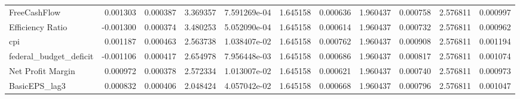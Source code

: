 \documentclass[12pt,a4paper,english]{article}
\begin{document}
{{\begin{tabular}{@{}lrrrrrrrrrr@{}}
			FreeCashFlow                  & 0.001303                 & 0.000387                    & 3.369357                  & 7.591269e-04                             & 1.645158                      & 0.000636                      & 1.960437                     & 0.000758                     & 2.576811                     & 0.000997                     \\
			Efficiency Ratio              & -0.001300                & 0.000374                    & 3.480253                  & 5.052090e-04                             & 1.645158                      & 0.000614                      & 1.960437                     & 0.000732                     & 2.576811                     & 0.000962                     \\
			cpi                           & 0.001187                 & 0.000463                    & 2.563738                  & 1.038407e-02                             & 1.645158                      & 0.000762                      & 1.960437                     & 0.000908                     & 2.576811                     & 0.001194                     \\
			federal\_budget\_deficit      & -0.001106                & 0.000417                    & 2.654978                  & 7.956448e-03                             & 1.645158                      & 0.000686                      & 1.960437                     & 0.000817                     & 2.576811                     & 0.001074                     \\
			Net Profit Margin             & 0.000972                 & 0.000378                    & 2.572334                  & 1.013007e-02                             & 1.645158                      & 0.000621                      & 1.960437                     & 0.000740                     & 2.576811                     & 0.000973                     \\
			BasicEPS\_lag3                & 0.000832                 & 0.000406                    & 2.048424                  & 4.057042e-02                             & 1.645158                      & 0.000668                      & 1.960437                     & 0.000796                     & 2.576811                     & 0.001047                     \\ \bottomrule
		\end{tabular}%
	}
}
\end{document}
